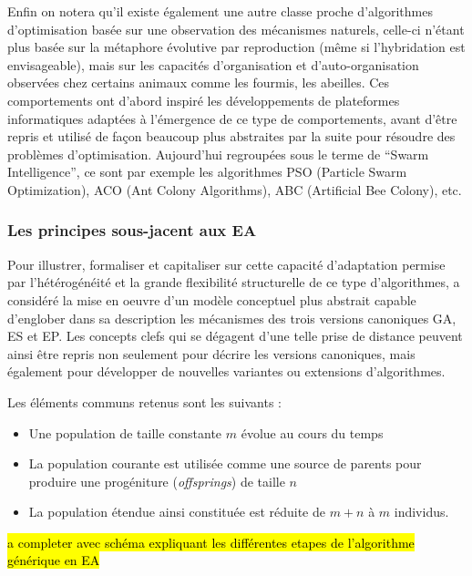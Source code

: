 Enfin on notera qu'il existe également une autre classe proche d'algorithmes d'optimisation basée sur une observation des mécanismes naturels, celle-ci n'étant plus basée sur la métaphore évolutive par reproduction (même si l'hybridation est envisageable), mais sur les capacités d'organisation et d'auto-organisation observées chez certains animaux comme les fourmis, les abeilles. Ces comportements ont d'abord inspiré les développements de plateformes informatiques adaptées à l'émergence de ce type de comportements, avant d'être repris et utilisé de façon beaucoup plus abstraites par la suite pour résoudre des problèmes d'optimisation. Aujourd'hui regroupées sous le terme de \foreignquote{english}{Swarm Intelligence}, ce sont par exemple les algorithmes PSO (Particle Swarm Optimization), ACO (Ant Colony Algorithms), ABC (Artificial Bee Colony), etc.

\subsubsection{Les principes sous-jacent aux EA}
\label{ssec:principesEA}

Pour illustrer, formaliser et capitaliser sur cette capacité d'adaptation  permise par l'hétérogénéité et la grande flexibilité structurelle de ce type d'algorithmes, \textcite[49]{DeJong2006a} a considéré la mise en oeuvre d'un modèle conceptuel plus abstrait capable d'englober dans sa description les mécanismes des trois versions canoniques GA, ES et EP. Les concepts clefs qui se dégagent d'une telle prise de distance peuvent ainsi être repris non seulement pour décrire les versions canoniques, mais également pour développer de nouvelles variantes ou extensions d'algorithmes.

Les éléments communs retenus sont les suivants :

\begin{itemize}
\item Une population de taille constante $m$ évolue au cours du temps
\item La population courante est utilisée comme une source de parents pour produire une progéniture (\textit{offsprings}) de taille $n$
\item La population étendue ainsi constituée est réduite de $m + n$ à $m$ individus.
\end{itemize}

\hl{a completer avec schéma expliquant les différentes etapes de l'algorithme générique en EA}

